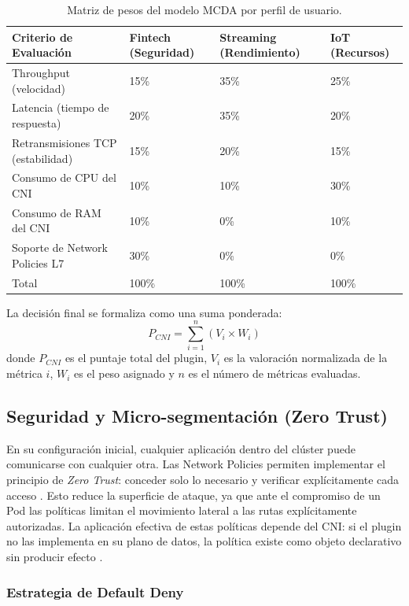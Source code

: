 \begin{table}[htbp]
\centering
\scriptsize
\caption{Matriz de pesos del modelo MCDA por perfil de usuario.}
\label{tab:pesos-mcda}
\begin{tabularx}{\textwidth}{|Y|Y|Y|Y|}
\hline
\textbf{Criterio de Evaluación} & \textbf{Fintech (Seguridad)} & \textbf{Streaming (Rendimiento)} & \textbf{IoT (Recursos)} \\
\hline
Throughput (velocidad) & 15\% & 35\% & 25\% \\
Latencia (tiempo de respuesta) & 20\% & 35\% & 20\% \\
Retransmisiones TCP (estabilidad) & 15\% & 20\% & 15\% \\
Consumo de CPU del CNI & 10\% & 10\% & 30\% \\
Consumo de RAM del CNI & 10\% & 0\% & 10\% \\
Soporte de Network Policies L7 & 30\% & 0\% & 0\% \\
Total & 100\% & 100\% & 100\% \\
\hline
\end{tabularx}
\end{table}

La decisión final se formaliza como una suma ponderada:
\[
P_{CNI}=\sum_{i=1}^{n}(V_i \times W_i)
\]
donde $P_{CNI}$ es el puntaje total del plugin, $V_i$ es la valoración normalizada de la métrica $i$, $W_i$ es el peso asignado y $n$ es el número de métricas evaluadas.

\subsection{Seguridad y Micro-segmentación (Zero Trust)}

En su configuración inicial, cualquier aplicación dentro del clúster puede comunicarse con cualquier otra. Las Network Policies permiten implementar el principio de \emph{Zero Trust}: conceder solo lo necesario y verificar explícitamente cada acceso \cite{ref24,ref25}. Esto reduce la superficie de ataque, ya que ante el compromiso de un Pod las políticas limitan el movimiento lateral a las rutas explícitamente autorizadas. La aplicación efectiva de estas políticas depende del CNI: si el plugin no las implementa en su plano de datos, la política existe como objeto declarativo sin producir efecto \cite{ref4,ref18}.

\subsubsection{Estrategia de Default Deny}

